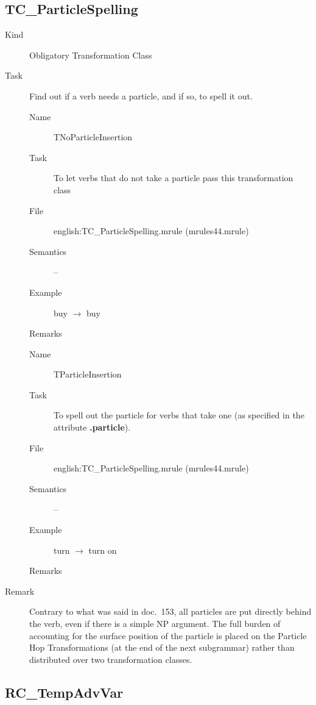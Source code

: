 \newpage
\subsection{TC\_ParticleSpelling}

\begin{description}
\item[Kind] Obligatory Transformation Class
\item[Task] Find out if a verb needs a particle, and if so, to spell it out.

\vspace{1 cm}
\begin{description}
\item[Name] TNoParticleInsertion
\item[Task] To let verbs that do not take a particle pass this transformation 
class
\item[File] english:TC\_ParticleSpelling.mrule (mrules44.mrule)
\item[Semantics] --
\item[Example] buy $\rightarrow$ buy
\item[Remarks]
\end{description}

\vspace{1 cm}
\begin{description}
\item[Name] TParticleInsertion
\item[Task] To spell out the particle for verbs that take one (as specified in 
the attribute {\bf .particle}).
\item[File] english:TC\_ParticleSpelling.mrule (mrules44.mrule)
\item[Semantics] --
\item[Example] turn $\rightarrow$ turn on
\item[Remarks]
\end{description}

\vspace{1 cm}
\item[Remark] Contrary to what was said in doc.\ 153, all particles are put 
directly behind the verb, even if there is a simple NP argument. The full 
burden of accounting for the surface position of the particle is placed on the 
Particle Hop Transformations (at the end of the next subgrammar) rather than 
distributed over two transformation classes. 
\end{description}

\newpage
\subsection{RC\_TempAdvVar}


